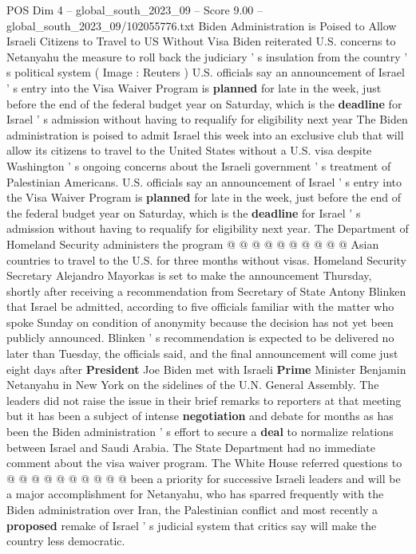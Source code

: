 \begin{textsample}{POS Dim 4 – global\_south\_2023\_09 – Score 9.00 – global\_south\_2023\_09/102055776.txt}  \label{ex:f4_pos_431}
Biden Administration is Poised to Allow Israeli Citizens to Travel to US Without Visa Biden reiterated U.S. concerns to Netanyahu the measure to roll back the judiciary ' s insulation from the country ' s political system ( Image : Reuters ) U.S. officials say an announcement of Israel ' s entry into the Visa Waiver Program is \textbf{planned} for late in the week, just before the end of the federal budget year on Saturday, which is the \textbf{deadline} for Israel ' s admission without having to requalify for eligibility next year The Biden administration is poised to admit Israel this week into an exclusive club that will allow its citizens to travel to the United States without a U.S. visa despite Washington ' s ongoing concerns about the Israeli government ' s treatment of Palestinian Americans.
U.S. officials say an announcement of Israel ' s entry into the Visa Waiver Program is \textbf{planned} for late in the week, just before the end of the federal budget year on Saturday, which is the \textbf{deadline} for Israel ' s admission without having to requalify for eligibility next year.
The Department of Homeland Security administers the program @ @ @ @ @ @ @ @ @ @ Asian countries to travel to the U.S. for three months without visas.
Homeland Security Secretary Alejandro Mayorkas is set to make the announcement Thursday, shortly after receiving a recommendation from Secretary of State Antony Blinken that Israel be admitted, according to five officials familiar with the matter who spoke Sunday on condition of anonymity because the decision has not yet been publicly announced.
Blinken ' s recommendation is expected to be delivered no later than Tuesday, the officials said, and the final announcement will come just eight days after \textbf{President} Joe Biden met with Israeli \textbf{Prime} Minister Benjamin Netanyahu in New York on the sidelines of the U.N.
General Assembly.
The leaders did not raise the issue in their brief remarks to reporters at that meeting but it has been a subject of intense \textbf{negotiation} and debate for months as has been the Biden administration ' s effort to secure a \textbf{deal} to normalize relations between Israel and Saudi Arabia.
The State Department had no immediate comment about the visa waiver program.
The White House referred questions to @ @ @ @ @ @ @ @ @ @ been a priority for successive Israeli leaders and will be a major accomplishment for Netanyahu, who has sparred frequently with the Biden administration over Iran, the Palestinian conflict and most recently a \textbf{proposed} remake of Israel ' s judicial system that critics say will make the country less democratic.

\end{textsample}
